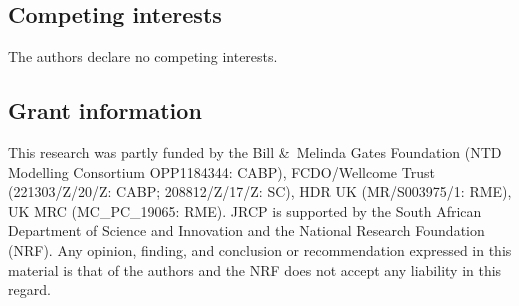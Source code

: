 \documentclass[10pt,a4paper,twocolumn]{article}
\begin{document}
\subsection*{Competing interests}
The authors declare no competing interests.

\subsection*{Grant information}
This research was partly funded by the Bill \&\ Melinda Gates Foundation (NTD Modelling Consortium OPP1184344: CABP), FCDO/Wellcome Trust (221303/Z/20/Z: CABP; 208812/Z/17/Z: SC), HDR UK (MR/S003975/1: RME), UK MRC (MC\_PC\_19065: RME). JRCP is supported by the South African Department of Science and Innovation and the National Research Foundation (NRF). Any opinion, finding, and conclusion or recommendation expressed in this material is that of the authors and the NRF does not accept any liability in this regard.

%

{\small
}



\end{document}
